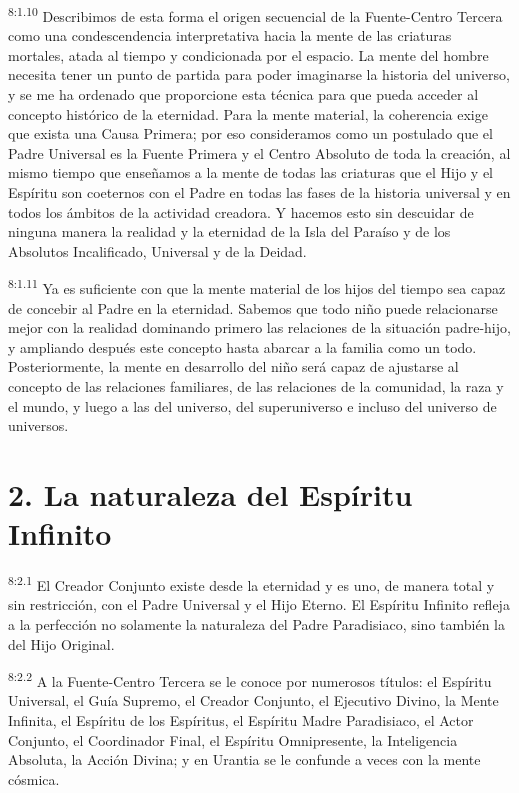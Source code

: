 \par
\textsuperscript{8:1.10} Describimos de esta forma el origen secuencial de la Fuente-Centro Tercera como una condescendencia interpretativa hacia la mente de las criaturas mortales, atada al tiempo y condicionada por el espacio. La mente del hombre necesita tener un punto de partida para poder imaginarse la historia del universo, y se me ha ordenado que proporcione esta técnica para que pueda acceder al concepto histórico de la eternidad. Para la mente material, la coherencia exige que exista una Causa Primera; por eso consideramos como un postulado que el Padre Universal es la Fuente Primera y el Centro Absoluto de toda la creación, al mismo tiempo que enseñamos a la mente de todas las criaturas que el Hijo y el Espíritu son coeternos con el Padre en todas las fases de la historia universal y en todos los ámbitos de la actividad creadora. Y hacemos esto sin descuidar de ninguna manera la realidad y la eternidad de la Isla del Paraíso y de los Absolutos Incalificado, Universal y de la Deidad.

\par
\textsuperscript{8:1.11} Ya es suficiente con que la mente material de los hijos del tiempo sea capaz de concebir al Padre en la eternidad. Sabemos que todo niño puede relacionarse mejor con la realidad dominando primero las relaciones de la situación padre-hijo, y ampliando después este concepto hasta abarcar a la familia como un todo. Posteriormente, la mente en desarrollo del niño será capaz de ajustarse al concepto de las relaciones familiares, de las relaciones de la comunidad, la raza y el mundo, y luego a las del universo, del superuniverso e incluso del universo de universos.

\section*{2. La naturaleza del Espíritu Infinito}
\par
\textsuperscript{8:2.1} El Creador Conjunto existe desde la eternidad y es uno, de manera total y sin restricción, con el Padre Universal y el Hijo Eterno. El Espíritu Infinito refleja a la perfección no solamente la naturaleza del Padre Paradisiaco, sino también la del Hijo Original.

\par
\textsuperscript{8:2.2} A la Fuente-Centro Tercera se le conoce por numerosos títulos: el Espíritu Universal, el Guía Supremo, el Creador Conjunto, el Ejecutivo Divino, la Mente Infinita, el Espíritu de los Espíritus, el Espíritu Madre Paradisiaco, el Actor Conjunto, el Coordinador Final, el Espíritu Omnipresente, la Inteligencia Absoluta, la Acción Divina; y en Urantia se le confunde a veces con la mente cósmica.

